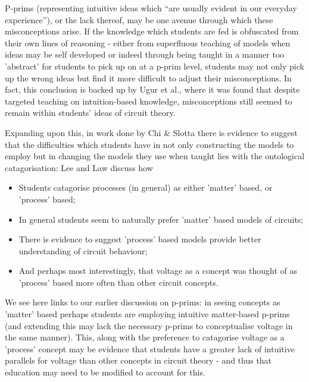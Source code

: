 \documentclass[a4paper,openany,nobib]{tufte-book}
\begin{document}
P-prims (representing intuitive ideas which ``are usually evident in our everyday experience''), or the lack thereof, may be one avenue through which these misconceptions arise. If the knowledge which students are fed is obfuscated from their own lines of reasoning - either from superfluous teaching of models when ideas may be self developed or indeed through being taught in a manner too 'abstract' for students to pick up on at a p-prim level, students may not only pick up the wrong ideas but find it more difficult to adjust their misconceptions. In fact, this conclusion is backed up by Ugur et al.\autocite{ugur}, where it was found that despite targeted teaching on intuition-based knowledge, misconceptions still seemed to remain within students' ideas of circuit theory.

Expanding upon this, in work done by Chi \& Slotta\autocite{slotta} there is evidence to suggest that the difficulties which students have in not only constructing the models to employ but in changing the models they use when taught lies with the ontological catagorisation: Lee and Law\autocite{lee2001} discuss how
\begin{itemize}
	\item Students catagorise processes (in general) as either 'matter' based, or 'process' based;
	\item In general students seem to naturally prefer 'matter' based models of circuits;
	\item There is evidence to suggest 'process' based models provide better understanding of circuit behaviour;
	\item And perhaps most interestingly, that voltage as a concept was thought of as 'process' based more often than other circuit concepts.
\end{itemize}
We see here links to our earlier discussion on p-prims:
in seeing concepts as 'matter' based perhaps students are employing intuitive matter-based p-prims (and extending this may lack the necessary p-prims to conceptualise voltage in the same manner). This, along with the preference to catagorise voltage as a 'process' concept may be evidence that students have a greater lack of intuitive parallels for voltage than other concepts in circuit theory - and thus that education may need to be modified to account for this. 
\end{document}
